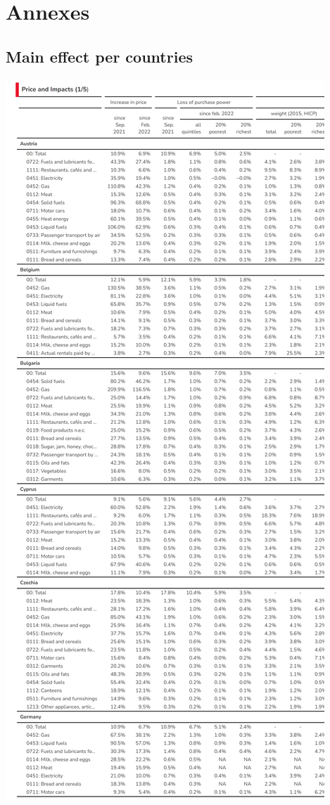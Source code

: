 \documentclass[
  9pt,
  a4paper,
  numbers=noendperiod,
  DIV=12]{scrartcl}
\begin{document}
\newpage

\hypertarget{annexes}{%
\section{Annexes}\label{annexes}}

\hypertarget{main-effect-per-countries}{%
\subsection{Main effect per countries}\label{main-effect-per-countries}}

\includegraphics{svg/annex_1.png}
\end{document}
